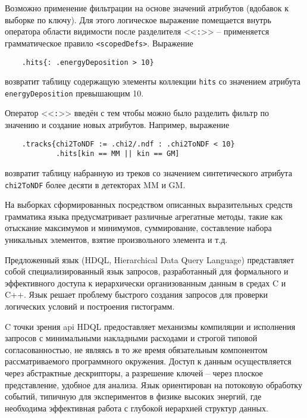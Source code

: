 Возможно применение фильтрации на основе значений атрибутов (вдобавок
к выборке по ключу). Для этого логическое
выражение помещается внутрь оператора области видимости после
разделителя <<\texttt{:}>> -- применяется
грамматическое правило \texttt{<scopedDefs>}. Выражение
\begin{verbatim}
    .hits{: .energyDeposition > 10}
\end{verbatim}
возвратит таблицу содержащую элементы коллекции \texttt{hits}
со значением атрибута \texttt{energyDeposition} превышающим 10.

Оператор <<\texttt{:}>> введён с тем чтобы можно было разделить
фильтр по значению и создание новых атрибутов. Например, выражение
\begin{verbatim}
    .tracks{chi2ToNDF := .chi2/.ndf : .chi2ToNDF < 10}
            .hits[kin == MM || kin == GM]
\end{verbatim}
возвратит таблицу набранную из треков со значением синтетического
атрибута \texttt{chi2ToNDF} более десяти в детекторах MM и GM.

На выборках сформированных посредством описанных выразительных средств
грамматика языка предусматривает различные агрегатные методы, такие как
отыскание максимумов и минимумов, суммирование, составление набора уникальных
элементов, взятие произвольного элемента и т.д.

Предложенный язык (HDQL, Hierarchical Data Query Language) представляет
собой специализированный язык запросов, разработанный для формального
и эффективного доступа к иерархически организованным данным в средах
C и C++. Язык решает проблему быстрого создания запросов для проверки
логических условий и построения гистограмм.



C точки зрения \acrshort{api} HDQL предоставляет механизмы компиляции и
исполнения запросов с минимальными накладными расходами и строгой типовой
согласованностью, не являясь в то же время обязательным компонентом
рассматриваемого программного окружения. Доступ к данным осуществляется
через абстрактные
дескрипторы, а разрешение ключей -- через плоское представление,
удобное для анализа. Язык ориентирован на потоковую обработку
событий, типичную для экспериментов в физике высоких энергий,
где необходима эффективная работа с глубокой иерархией
структур данных.
